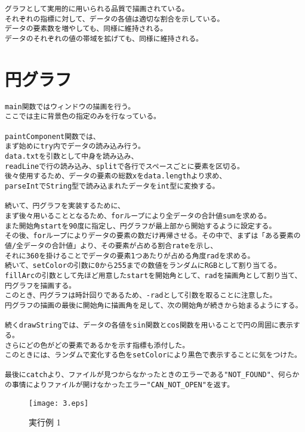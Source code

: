 \documentclass{jarticle}
\begin{document}
\begin{verbatim}
グラフとして実用的に用いられる品質で描画されている。
それぞれの指標に対して、データの各値は適切な割合を示している。
データの要素数を増やしても、同様に維持される。
データのそれぞれの値の帯域を拡げても、同様に維持される。
\end{verbatim}

\newpage
\section{円グラフ}
\begin{verbatim}
main関数ではウィンドウの描画を行う。
ここでは主に背景色の指定のみを行なっている。

paintComponent関数では、
まず始めにtry内でデータの読み込み行う。
data.txtを引数として中身を読み込み、
readLineで行の読み込み、splitで各行でスペースごとに要素を区切る。
後々使用するため、データの要素の総数xをdata.lengthより求め、
parseIntでString型で読み込まれたデータをint型に変換する。

続いて、円グラフを実装するために、
まず後々用いることとなるため、forループにより全データの合計値sumを求める。
また開始角startを90度に指定し、円グラフが最上部から開始するように設定する。
その後、forループによりデータの要素の数だけ再帰させる。その中で、まずは「ある要素の値/全データの合計値」より、その要素が占める割合rateを示し、
それに360を掛けることでデータの要素1つあたりが占める角度radを求める。
続いて、setColorの引数に0から255までの数値をランダムにRGBとして割り当てる。
fillArcの引数として先ほど用意したstartを開始角として、radを描画角として割り当て、円グラフを描画する。
このとき、円グラフは時計回りであるため、-radとして引数を取ることに注意した。
円グラフの描画の最後に開始角に描画角を足して、次の開始角が続きから始まるようにする。

続くdrawStringでは、データの各値をsin関数とcos関数を用いることで円の周囲に表示する。
さらにどの色がどの要素であるかを示す指標も添付した。
このときには、ランダムで変化する色をsetColorにより黒色で表示することに気をつけた。

最後にcatchより、ファイルが見つからなかったときのエラーである"NOT_FOUND"、何らかの事情によりファイルが開けなかったエラー"CAN_NOT_OPEN"を返す。

\end{verbatim}

\begin{figure}[H]
\begin{center}
\texttt{[image: 3.eps]}
\end{center}
\caption{実行例 1}
\end{figure}
\end{document}
